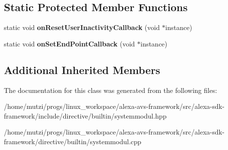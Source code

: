 \subsection*{Static Protected Member Functions}
\begin{DoxyCompactItemize}
\item 
\mbox{\label{classdirective_1_1SystemModul_afcd9d1c69a3aa55d2f970b6368237237}} 
static void {\bfseries on\+Reset\+User\+Inactivity\+Callback} (void $\ast$instance)
\item 
\mbox{\label{classdirective_1_1SystemModul_a16a44378261a552bf22454afc6f35d36}} 
static void {\bfseries on\+Set\+End\+Point\+Callback} (void $\ast$instance)
\end{DoxyCompactItemize}
\subsection*{Additional Inherited Members}


The documentation for this class was generated from the following files\+:\begin{DoxyCompactItemize}
\item 
/home/mutzi/progs/linux\+\_\+workspace/alexa-\/avs-\/framework/src/alexa-\/sdk-\/framework/include/directive/builtin/systemmodul.\+hpp\item 
/home/mutzi/progs/linux\+\_\+workspace/alexa-\/avs-\/framework/src/alexa-\/sdk-\/framework/directive/builtin/systemmodul.\+cpp\end{DoxyCompactItemize}

